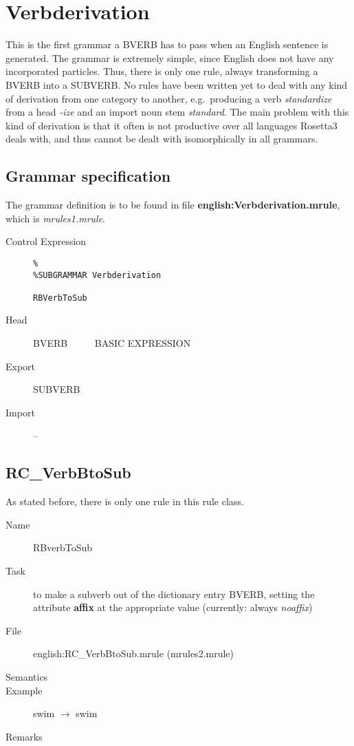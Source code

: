 \newpage
\section{Verbderivation}
This is the first grammar a BVERB has to pass when an English sentence is 
generated. The grammar is extremely simple, since English does not have any 
incorporated particles. Thus, there is only one rule, always transforming a
BVERB into a SUBVERB. No rules have been written yet to deal with any kind of 
derivation from one category to another, e.g.\ producing a verb {\em standardize
\/} from a head {\em -ize\/} and an import noun stem {\em standard\/}. The main 
problem with this kind of derivation is that it often is not productive over 
all languages Rosetta3 deals with, and thus cannot be dealt with isomorphically 
in all grammars.

\subsection{Grammar specification}
The grammar definition is to be found in file {\bf 
english:Verbderivation.mrule}, which is {\em mrules1.mrule\/}.

\begin{description}
\item[Control Expression] \mbox{}
   \begin{verbatim}
%
%SUBGRAMMAR Verbderivation

RBVerbToSub 
   \end{verbatim}
\item[Head]    BVERB    \ \ \ \ \ BASIC EXPRESSION 
\item[Export]  SUBVERB 
\item[Import] --
\end{description}


\subsection{RC\_VerbBtoSub}
As stated before, there is only one rule in this rule class.

\begin{description}
\item[Name] RBverbToSub
\item[Task] to make a subverb out of the dictionary entry BVERB, setting the 
attribute {\bf affix} at the appropriate value (currently: always {\em 
noaffix\/})
\item[File] english:RC\_VerbBtoSub.mrule (mrules2.mrule)
\item[Semantics]
\item[Example] swim $\rightarrow$ swim 
\item[Remarks]
\end{description}


